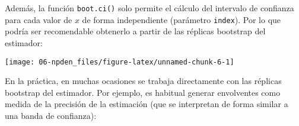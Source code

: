 \documentclass[]{book}
\newenvironment{Shaded}{\begin{snugshade}}{\end{snugshade}}
\newcommand{\KeywordTok}[1]{\textcolor[rgb]{0.13,0.29,0.53}{\textbf{#1}}}
\newcommand{\DataTypeTok}[1]{\textcolor[rgb]{0.13,0.29,0.53}{#1}}
\newcommand{\DecValTok}[1]{\textcolor[rgb]{0.00,0.00,0.81}{#1}}
\newcommand{\FloatTok}[1]{\textcolor[rgb]{0.00,0.00,0.81}{#1}}
\newcommand{\StringTok}[1]{\textcolor[rgb]{0.31,0.60,0.02}{#1}}
\newcommand{\CommentTok}[1]{\textcolor[rgb]{0.56,0.35,0.01}{\textit{#1}}}
\newcommand{\OperatorTok}[1]{\textcolor[rgb]{0.81,0.36,0.00}{\textbf{#1}}}
\newcommand{\NormalTok}[1]{#1}
\theoremstyle{break}
\theoremstyle{definition}
\theoremstyle{definition}
\theoremstyle{definition}
\theoremstyle{remark}
\begin{document}
Además, la función \texttt{boot.ci()} solo permite el cálculo del
intervalo de confianza para cada valor de \(x\) de forma independiente
(parámetro \texttt{index}). Por lo que podría ser recomendable obtenerlo
a partir de las réplicas bootstrap del estimador:

\begin{Shaded}
\end{Shaded}

\begin{center}\texttt{[image: 06-npden\_files/figure-latex/unnamed-chunk-6-1]} \end{center}

En la práctica, en muchas ocasiones se trabaja directamente con las
réplicas bootstrap del estimador. Por ejemplo, es habitual generar
envolventes como medida de la precisión de la estimación (que se
interpretan de forma similar a una banda de confianza):
\end{document}
